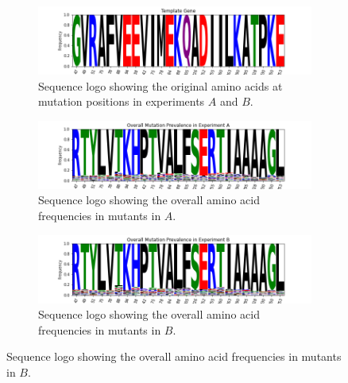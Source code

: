 \documentclass[16pt]{article}
\begin{document}
\begin{figure}
	\caption{\label{logos} Sequence logos.}
\begin{subfigure}{\textwidth}
	\includegraphics[width=\textwidth]{img/template-logo.png}
	\caption{\label{logot} Sequence logo showing the original amino acids at mutation positions in experiments $A$ and $B$.}
\end{subfigure}
\begin{subfigure}{\textwidth}
	\includegraphics[width=\textwidth]{img/exp-a-logo.png}
	\caption{\label{logoa} Sequence logo showing the overall amino acid frequencies in mutants in $A$.}
\end{subfigure}
\begin{subfigure}{\textwidth}
	\includegraphics[width=\textwidth]{img/exp-b-logo.png}
	\caption{\label{logob} Sequence logo showing the overall amino acid frequencies in mutants in $B$.}
\end{subfigure}
\end{figure}
\end{document}
